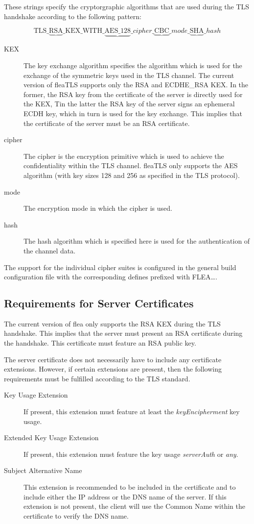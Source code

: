 \documentclass[a4paper,11pt]{scrartcl}
\begin{document}
These strings specify the cryptorgraphic algorithms that are used during the TLS
handshake according to the following pattern:

$$
\mathrm{TLS\_}\underbrace{\mathrm{RSA}}\_{\mathrm{KEX}}\mathrm{\_WITH\_}\underbrace{\mathrm{AES\_128}}\_{cipher}\_\underbrace{\mathrm{CBC}}\_{mode
}\_\underbrace{\mathrm{SHA}}\_{hash }
$$
\begin{description}
  \item[KEX] The key exchange algorithm specifies the algorithm which is used
    for the exchange of the symmetric keys used in the TLS channel. The current
    version of fleaTLS supports only the RSA and ECDHE\_RSA KEX. In the former,
    the RSA key from the certificate of the server is directly used for the KEX,
    Tin the latter the RSA key of the server signs an ephemeral ECDH key, which
    in turn is used for the key exchange. This implies that the
    certificate of the server must be an RSA certificate.
  \item[cipher] The cipher is the encryption primitive which is used to achieve
    the confidentiality within the TLS channel. fleaTLS only supports the AES
    algorithm (with key sizes 128 and 256 as specified in the TLS protocol).
  \item [mode] The encryption mode in which the cipher is used. 
  \item[hash] The hash algorithm which is specified here is used for the
    authentication of the channel data.
  \end{description}
The support for the individual cipher suites is configured in the general build
configuration file with the corresponding defines prefixed with FLEA\ldots .


\subsection{Requirements for Server Certificates}

The current version of flea only supports the RSA KEX during the TLS handshake.
This implies that the server must present an RSA certificate during the
handshake. This certificate must feature an RSA public key.

The server certificate does not necessarily have to include any certificate
extensions. However, if certain extensions are present, then the following
requirements must be fulfilled according to the TLS standard.
\begin{description}
  \item [Key Usage Extension] If present, this extension must feature at least
    the \emph{keyEncipherment} key usage.
  \item [Extended Key Usage Extension] If present, this extension must feature
    the key usage \emph{serverAuth} or \emph{any}.
  \item [Subject Alternative Name] This extension is recommended to be included
    in the certificate and to include either the IP address or the DNS name of
    the server. If this extension is not present, the client will use the Common
Name within the certificate to verify the DNS name.
\end{description}
\end{document}
